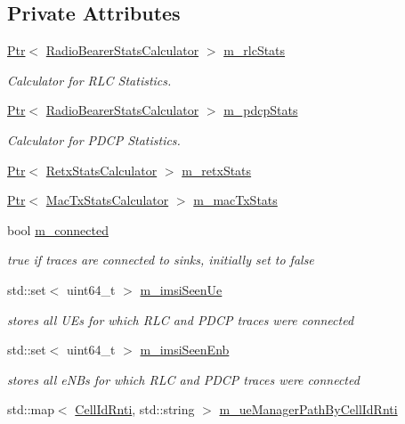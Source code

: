 \subsection*{Private Attributes}
\begin{DoxyCompactItemize}
\item 
\hyperlink{classns3_1_1Ptr}{Ptr}$<$ \hyperlink{classns3_1_1RadioBearerStatsCalculator}{Radio\+Bearer\+Stats\+Calculator} $>$ \hyperlink{classns3_1_1RadioBearerStatsConnector_a25b5370b25e598c40f5d40d845ca072b}{m\+\_\+rlc\+Stats}
\begin{DoxyCompactList}\small\item\em Calculator for R\+LC Statistics. \end{DoxyCompactList}\item 
\hyperlink{classns3_1_1Ptr}{Ptr}$<$ \hyperlink{classns3_1_1RadioBearerStatsCalculator}{Radio\+Bearer\+Stats\+Calculator} $>$ \hyperlink{classns3_1_1RadioBearerStatsConnector_a984690769317e9eddba15e49170f10d9}{m\+\_\+pdcp\+Stats}
\begin{DoxyCompactList}\small\item\em Calculator for P\+D\+CP Statistics. \end{DoxyCompactList}\item 
\hyperlink{classns3_1_1Ptr}{Ptr}$<$ \hyperlink{classns3_1_1RetxStatsCalculator}{Retx\+Stats\+Calculator} $>$ \hyperlink{classns3_1_1RadioBearerStatsConnector_ad6d3ef18f579f2da0e2bee4f1850e205}{m\+\_\+retx\+Stats}
\item 
\hyperlink{classns3_1_1Ptr}{Ptr}$<$ \hyperlink{classns3_1_1MacTxStatsCalculator}{Mac\+Tx\+Stats\+Calculator} $>$ \hyperlink{classns3_1_1RadioBearerStatsConnector_a76197254baf4c7b67ea68a421363e7fc}{m\+\_\+mac\+Tx\+Stats}
\item 
bool \hyperlink{classns3_1_1RadioBearerStatsConnector_ad8b0778133817a28e6cb1b81397b9f57}{m\+\_\+connected}
\begin{DoxyCompactList}\small\item\em true if traces are connected to sinks, initially set to false \end{DoxyCompactList}\item 
std\+::set$<$ uint64\+\_\+t $>$ \hyperlink{classns3_1_1RadioBearerStatsConnector_a64da3f4515c955766ccdc29a381043c8}{m\+\_\+imsi\+Seen\+Ue}
\begin{DoxyCompactList}\small\item\em stores all U\+Es for which R\+LC and P\+D\+CP traces were connected \end{DoxyCompactList}\item 
std\+::set$<$ uint64\+\_\+t $>$ \hyperlink{classns3_1_1RadioBearerStatsConnector_a4612176e465e21454cfaa4e610fd6c53}{m\+\_\+imsi\+Seen\+Enb}
\begin{DoxyCompactList}\small\item\em stores all e\+N\+Bs for which R\+LC and P\+D\+CP traces were connected \end{DoxyCompactList}\item 
std\+::map$<$ \hyperlink{structns3_1_1RadioBearerStatsConnector_1_1CellIdRnti}{Cell\+Id\+Rnti}, std\+::string $>$ \hyperlink{classns3_1_1RadioBearerStatsConnector_aae236a1dedc73f04344d6d6bde132331}{m\+\_\+ue\+Manager\+Path\+By\+Cell\+Id\+Rnti}
\end{DoxyCompactItemize}
